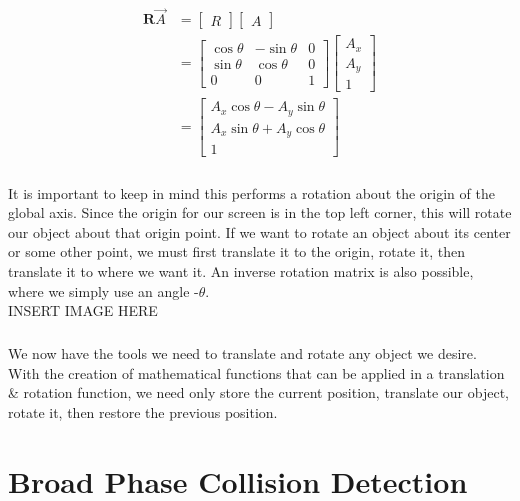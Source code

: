 \documentclass[12pt, letterpaper]{report}
\begin{document}
	\begin{align*}
	\mathbf
	R\overrightarrow{A} &= \begin{bmatrix}R\end{bmatrix}\begin{bmatrix}A\end{bmatrix}\\
	&=
	\begin{bmatrix}
	\cos{\theta} & -\sin{\theta} & 0\\
	\sin{\theta} & \cos{\theta} & 0\\
	0 & 0 & 1
	\end{bmatrix}
	\begin{bmatrix}
	A_x\\
	A_y\\
	1
	\end{bmatrix}\\
	&=
	\begin{bmatrix}
	A_x\cos{\theta} - A_y\sin{\theta}\\
	A_x\sin{\theta} + A_y\cos{\theta}\\
	1
	\end{bmatrix}
	\end{align*}

	\paragraph{} It is important to keep in mind this performs a rotation about the origin of the global axis. Since the origin for our screen is in the top left corner, this will rotate our object about that origin point. If we want to rotate an object about its center or some other point, we must first translate it to the origin, rotate it, then translate it to where we want it. An inverse rotation matrix is also possible, where we simply use an angle -$\theta$.
\\

	\Huge INSERT IMAGE HERE
	\normalsize

	\paragraph{} We now have the tools we need to translate and rotate any object we desire. With the creation of mathematical functions that can be applied in a translation \& rotation function, we need only store the current position, translate our object, rotate it, then restore the previous position.

\chapter{Broad Phase Collision Detection}
\end{document}
